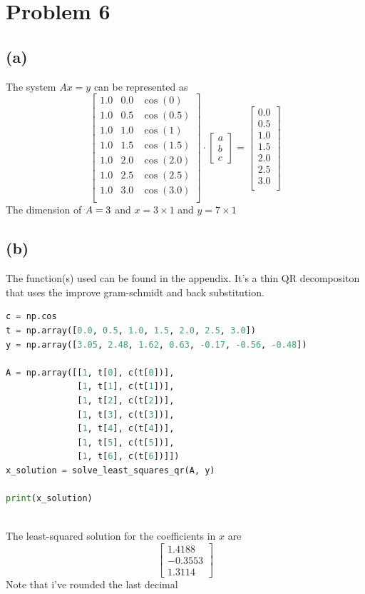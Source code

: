 \documentclass[12pt]{article}
\begin{document}
\section*{Problem 6}
\subsection*{(a)}
The system $Ax = y$ can be represented as
\[
\begin{bmatrix}
1.0 & 0.0 & \cos(0) \\
1.0 & 0.5 & \cos(0.5) \\
1.0 & 1.0 & \cos(1) \\
1.0 & 1.5 & \cos(1.5) \\
1.0 & 2.0 & \cos(2.0) \\
1.0 & 2.5 & \cos(2.5) \\
1.0 & 3.0 & \cos(3.0) \\
\end{bmatrix} \cdot \begin{bmatrix}
    a \\
    b \\
    c
\end{bmatrix}
= 
\begin{bmatrix}
    0.0 \\
    0.5 \\
    1.0\\
    1.5 \\
    2.0\\
    2.5 \\
    3.0\\
\end{bmatrix}
\]
The dimension of $A = 3\time 7$ and $x = 3\times 1$ and $y = 7\times 1$
\subsection*{(b)}
The function(s) used can be found in the appendix. It's a thin QR decompositon that uses the improve gram-schmidt and back substitution.
\begin{lstlisting}[language=Python]
c = np.cos
t = np.array([0.0, 0.5, 1.0, 1.5, 2.0, 2.5, 3.0])
y = np.array([3.05, 2.48, 1.62, 0.63, -0.17, -0.56, -0.48])

A = np.array([[1, t[0], c(t[0])],
              [1, t[1], c(t[1])],
              [1, t[2], c(t[2])],
              [1, t[3], c(t[3])],
              [1, t[4], c(t[4])],
              [1, t[5], c(t[5])],
              [1, t[6], c(t[6])]])
x_solution = solve_least_squares_qr(A, y)

print(x_solution)
    
\end{lstlisting}
The least-squared solution for the coefficients in $x$ are 
\[
\begin{bmatrix}
    1.4188\\
    -0.3553 \\
    1.3114
\end{bmatrix}
\]
Note that i've rounded the last decimal
\end{document}
